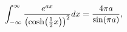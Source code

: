 \[\int_{-\infty}^{\infty}\frac{e^{ax}}{\left(\mathop{\cosh\/}\nolimits\!\left(%
\tfrac{1}{2}x\right)\right)^{2}}dx=\frac{4\pi a}{\mathop{\sin\/}\nolimits\!%
\left(\pi a\right)},\]